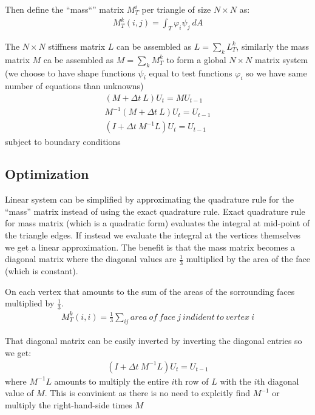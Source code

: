 \documentclass{birkjour}
\numberwithin{equation}{section}
\begin{document}
Then define the ``mass``'' matrix $M_T^i$ per triangle of size $N \times N$ as:
\begin{eqnarray} 
	M_T^k(i,j) = \int_{T}{ \varphi_i \psi_j \ dA} \nonumber
\end{eqnarray}

The $N \times N$ stiffness matrix $L$ can be assembled as $L = \sum_k L_T^k$, similarly the mass matrix $M$ 
ca be assembled as $M = \sum_k M_T^k$ to form a global $N \times N$ matrix system 
(we choose to have shape functions $\psi_i$ equal to test functions $\varphi_i$ so 
we have same number of equations than unknowns)
\begin{eqnarray}
	(M + \Delta t \ L) U_t = M U_{t-1} \nonumber\\
	M^{-1} (M + \Delta t \ L) U_t = U_{t-1} \nonumber\\
	(I + \Delta t \ M^{-1} L) U_t = U_{t-1}
\end{eqnarray}
subject to boundary conditions

\subsection{Optimization}
 
Linear system can be simplified by approximating the quadrature rule for the ``mass'' matrix instead of using the exact 
quadrature rule. Exact quadrature rule for mass matrix (which is a quadratic form) evaluates
the integral at mid-point of the triangle edges. If instead we evaluate the integral at the vertices themselves we get
a linear approximation. The benefit is that the mass matrix becomes a diagonal matrix where the diagonal values are 
$\frac{1}{3}$ multiplied by the area of the face (which is constant). 
 
On each vertex that amounts to the sum of the areas of the sorrounding faces multiplied by $\frac{1}{3}$.
\begin{eqnarray}
	M_T^k(i,i) = \frac{1}{3} \sum_{ij} { area \ of \ face \ j \ indident \ to \ vertex \ i }
\end{eqnarray}
 
That diagonal matrix can be easily inverted by inverting the diagonal entries so we get:
\begin{eqnarray}
	(I + \Delta t \ M^{-1} L) U_t = U_{t-1}
\end{eqnarray}
where $M^{-1} L$ amounts to multiply the entire $i$th row of $L$ with the $i$th diagonal value of $M$.
This is convinient as there is no need to explcitly find $M^{-1}$ or multiply the right-hand-side times $M$
\end{document}
